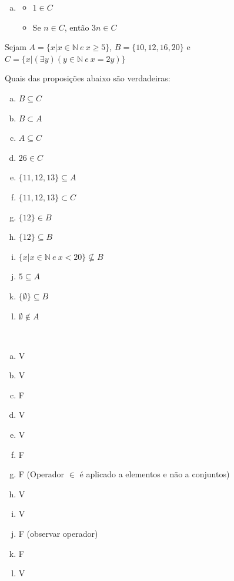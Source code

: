 \documentclass[a4paper, 12pt, addpoints]{exam}
\begin{document}
\begin{questions}
\begin{resp}
\begin{enumerate}[a)]
        \item 
            
        \begin{itemize}
                \item $1 \in C$
                \item Se $n \in C$, então $3n \in C$
            \end{itemize}
    \end{enumerate}
\end{resp}
  
\question Sejam $A = \{x | x \in \mathbb{N} ~ e ~ x \geq 5\}$, $B = \{10, 12, 16, 20\}$ e $C = \{x | (\exists y)(y \in \mathbb{N} ~ e ~ x = 2y)\}$

Quais das proposições abaixo são verdadeiras:

\begin{multicols}{2}
  \begin{enumerate}[a)]
      \item $B \subseteq C$
      \item $B \subset A$
      \item $A \subseteq C$
      \item $26 \in C$
      \item $\{11, 12, 13\} \subseteq A$
      \item $\{11, 12, 13\} \subset C$
      \item $\{12\} \in B$
      \item $\{12\} \subseteq B$
      \item $\{x | x \in \mathbb{N} ~ e ~ x < 20\} \nsubseteq B$
      \item $5 \subseteq A$
      \item $\{\emptyset\} \subseteq B$
      \item $\emptyset \notin A$
  \end{enumerate}
\end{multicols}

\begin{resp}~

    \begin{multicols}{4}
        \begin{enumerate}[a)]
            \item V
            \item V
            \item F
            \item V
            \item V
            \item F
            \item F (Operador $\in$ é aplicado a elementos e não a conjuntos)
            \item V
            \item V
            \item F (observar operador)
            \item F
            \item V
        \end{enumerate}
      \end{multicols}
\end{resp}


\end{questions}
\end{document}
